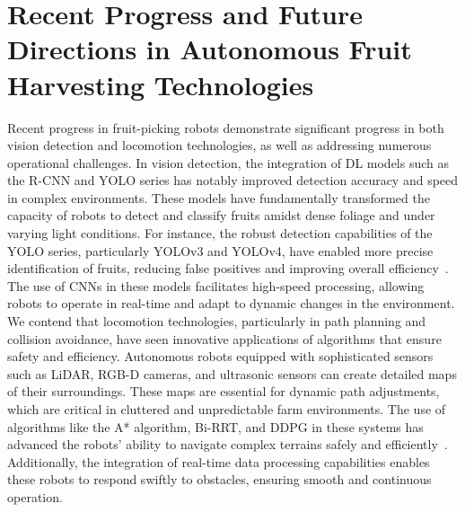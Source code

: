 \documentclass[a4paper,fleqn]{cas-dc}
\begin{document}
\section{Recent Progress and Future Directions in Autonomous Fruit Harvesting Technologies}

Recent progress in fruit-picking robots demonstrate significant progress in both vision detection and locomotion technologies, as well as addressing numerous operational challenges. In vision detection, the integration of DL models such as the R-CNN and YOLO series has notably improved detection accuracy and speed in complex environments. These models have fundamentally transformed the capacity of robots to detect and classify fruits amidst dense foliage and under varying light conditions. For instance, the robust detection capabilities of the YOLO series, particularly YOLOv3 and YOLOv4, have enabled more precise identification of fruits, reducing false positives and improving overall efficiency~\cite{mehta2016robust, kirk2020b}. The use of CNNs in these models facilitates high-speed processing, allowing robots to operate in real-time and adapt to dynamic changes in the environment.
We contend that locomotion technologies, particularly in path planning and collision avoidance, have seen innovative applications of algorithms that ensure safety and efficiency. Autonomous robots equipped with sophisticated sensors such as LiDAR, RGB-D cameras, and ultrasonic sensors can create detailed maps of their surroundings. These maps are essential for dynamic path adjustments, which are critical in cluttered and unpredictable farm environments. The use of algorithms like the A* algorithm, Bi-RRT, and DDPG in these systems has advanced the robots' ability to navigate complex terrains safely and efficiently~\cite{yaguchi2016development, williams2020improvements}. Additionally, the integration of real-time data processing capabilities enables these robots to respond swiftly to obstacles, ensuring smooth and continuous operation.
\end{document}
